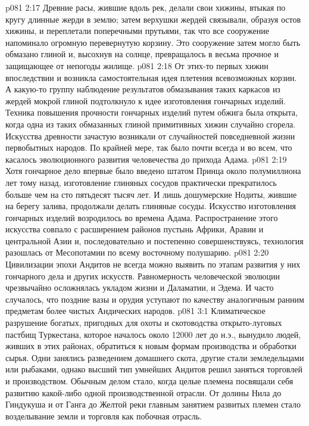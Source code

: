 \vs p081 2:17 Древние расы, жившие вдоль рек, делали свои хижины, втыкая по кругу длинные жерди в землю; затем верхушки жердей связывали, образуя остов хижины, и переплетали поперечными прутьями, так что все сооружение напоминало огромную перевернутую корзину. Это сооружение затем могло быть обмазано глиной и, высохнув на солнце, превращалось в весьма прочное и защищающее от непогоды жилище.
\vs p081 2:18 От этих\hyp{}то первых хижин впоследствии и возникла самостоятельная идея плетения всевозможных корзин. А какую\hyp{}то группу наблюдение результатов обмазывания таких каркасов из жердей мокрой глиной подтолкнуло к идее изготовления гончарных изделий. Техника повышения прочности гончарных изделий путем обжига была открыта, когда одна из таких обмазанных глиной примитивных хижин случайно сгорела. Искусства древности зачастую возникали от случайностей повседневной жизни первобытных народов. По крайней мере, так было почти всегда и во всем, что касалось эволюционного развития человечества до прихода Адама.
\vs p081 2:19 Хотя гончарное дело впервые было введено штатом Принца около полумиллиона лет тому назад, изготовление глиняных сосудов практически прекратилось больше чем на сто пятьдесят тысяч лет. И лишь дошумерские Нодиты, жившие на берегу залива, продолжали делать глиняные сосуды. Искусство изготовления гончарных изделий возродилось во времена Адама. Распространение этого искусства совпало с расширением районов пустынь Африки, Аравии и центральной Азии и, последовательно и постепенно совершенствуясь, технология разошлась от Месопотамии по всему восточному полушарию.
\vs p081 2:20 Цивилизации эпохи Андитов не всегда можно выявить по этапам развития у них гончарного дела и других искусств. Равномерность человеческой эволюции чрезвычайно осложнялась укладом жизни и Даламатии, и Эдема. И часто случалось, что поздние вазы и орудия уступают по качеству аналогичным ранним предметам более чистых Андических народов.
\vs p081 3:1 Климатическое разрушение богатых, пригодных для охоты и скотоводства открыто\hyp{}луговых пастбищ Туркестана, которое началось около 12000 лет до н.э., вынудило людей, живших в этих районах, обратиться к новым формам производства и обработки сырья. Одни занялись разведением домашнего скота, другие стали земледельцами или рыбаками, однако высший тип умнейших Андитов решил заняться торговлей и производством. Обычным делом стало, когда целые племена посвящали себя развитию какой\hyp{}либо одной производственной отрасли. От долины Нила до Гиндукуша и от Ганга до Желтой реки главным занятием развитых племен стало возделывание земли и торговля как побочная отрасль.
